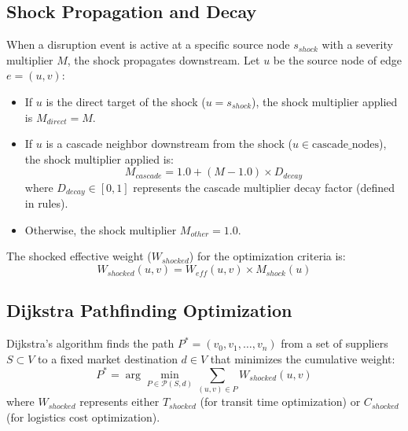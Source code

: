 \subsection{Shock Propagation and Decay}
When a disruption event is active at a specific source node $s_{shock}$ with a severity multiplier $M$, the shock propagates downstream. Let $u$ be the source node of edge $e = (u, v)$:
\begin{itemize}
    \item If $u$ is the direct target of the shock ($u = s_{shock}$), the shock multiplier applied is $M_{direct} = M$.
    \item If $u$ is a cascade neighbor downstream from the shock ($u \in \text{cascade\_nodes}$), the shock multiplier applied is:
    \begin{equation}
        M_{cascade} = 1.0 + (M - 1.0) \times D_{decay}
    \end{equation}
    where $D_{decay} \in [0, 1]$ represents the cascade multiplier decay factor (defined in rules).
    \item Otherwise, the shock multiplier $M_{other} = 1.0$.
\end{itemize}
The shocked effective weight ($W_{shocked}$) for the optimization criteria is:
\begin{equation}
    W_{shocked}(u, v) = W_{eff}(u, v) \times M_{shock}(u)
\end{equation}

\subsection{Dijkstra Pathfinding Optimization}
Dijkstra's algorithm finds the path $P^* = (v_0, v_1, \dots, v_n)$ from a set of suppliers $S \subset V$ to a fixed market destination $d \in V$ that minimizes the cumulative weight:
\begin{equation}
    P^* = \arg\min_{P \in \mathcal{P}(S, d)} \sum_{(u, v) \in P} W_{shocked}(u, v)
\end{equation}
where $W_{shocked}$ represents either $T_{shocked}$ (for transit time optimization) or $C_{shocked}$ (for logistics cost optimization).

